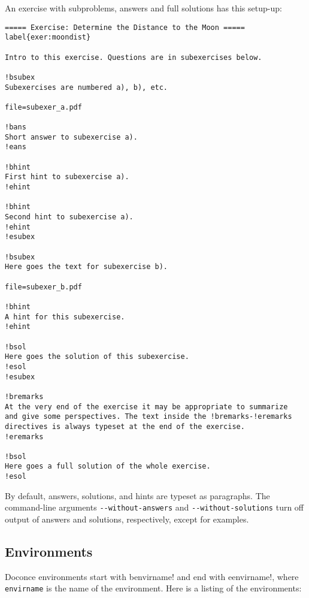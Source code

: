 \documentclass[%
oneside,                 %
final,                   %
10pt]{article}
\begin{document}
An exercise with subproblems, answers and full solutions has this
setup-up:

\begin{Verbatim}[numbers=none,fontsize=\fontsize{9pt}{9pt},baselinestretch=0.85,xleftmargin=0mm]
===== Exercise: Determine the Distance to the Moon =====
label{exer:moondist}

Intro to this exercise. Questions are in subexercises below.

!bsubex
Subexercises are numbered a), b), etc.

file=subexer_a.pdf

!bans
Short answer to subexercise a).
!eans

!bhint
First hint to subexercise a).
!ehint

!bhint
Second hint to subexercise a).
!ehint
!esubex

!bsubex
Here goes the text for subexercise b).

file=subexer_b.pdf

!bhint
A hint for this subexercise.
!ehint

!bsol
Here goes the solution of this subexercise.
!esol
!esubex

!bremarks
At the very end of the exercise it may be appropriate to summarize
and give some perspectives. The text inside the !bremarks-!eremarks
directives is always typeset at the end of the exercise.
!eremarks

!bsol
Here goes a full solution of the whole exercise.
!esol

\end{Verbatim}
By default, answers, solutions, and hints are typeset as paragraphs.
The command-line arguments \Verb!--without-answers! and \Verb!--without-solutions!
turn off output of answers and solutions, respectively, except for
examples.


\subsection{Environments}

Doconce environments start with \Verb!!benvirname! and end with \Verb!!eenvirname!,
where \Verb!envirname! is the name of the environment. Here is a listing of
the environments:
\end{document}

